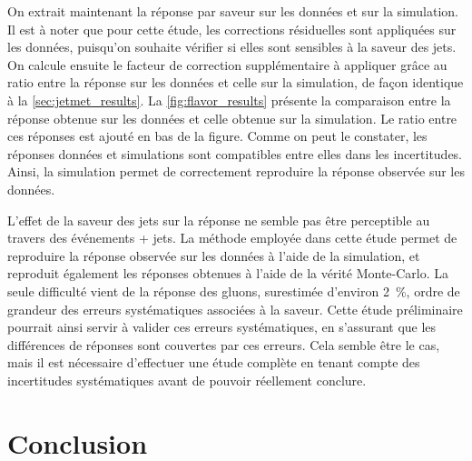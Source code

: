 On extrait maintenant la réponse par saveur sur les données et sur la simulation. Il est à noter que pour cette étude, les corrections résiduelles sont appliquées sur les données, puisqu'on souhaite vérifier si elles sont sensibles à la saveur des jets. On calcule ensuite le facteur de correction supplémentaire à appliquer grâce au ratio entre la réponse sur les données et celle sur la simulation, de façon identique à la \cref{sec:jetmet_results}. La \cref{fig:flavor_results} présente la comparaison entre la réponse obtenue sur les données et celle obtenue sur la simulation. Le ratio entre ces réponses est ajouté en bas de la figure. Comme on peut le constater, les réponses données et simulations sont compatibles entre elles dans les incertitudes. Ainsi, la simulation permet de correctement reproduire la réponse observée sur les données.

\bigskip


L'effet de la saveur des jets sur la réponse ne semble pas être perceptible au travers des événements \Pgamma + jets. La méthode employée dans cette étude permet de reproduire la réponse observée sur les données à l'aide de la simulation, et reproduit également les réponses obtenues à l'aide de la vérité Monte-Carlo. La seule difficulté vient de la réponse des gluons, surestimée d'environ \tilde\SI{2}{\percent}, ordre de grandeur des erreurs systématiques associées à la saveur. Cette étude préliminaire pourrait ainsi servir à valider ces erreurs systématiques, en s'assurant que les différences de réponses sont couvertes par ces erreurs. Cela semble être le cas, mais il est nécessaire d'effectuer une étude complète en tenant compte des incertitudes systématiques avant de pouvoir réellement conclure.

\section{Conclusion}

